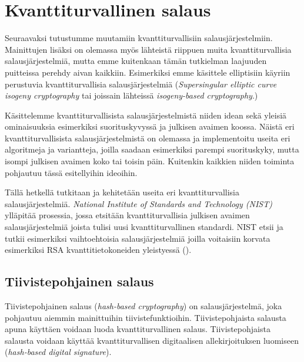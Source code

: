 \chapter{Kvanttiturvallinen salaus\label{results}}

Seuraavaksi tutustumme muutamiin kvanttiturvallisiin salausjärjestelmiin. Mainittujen lisäksi on olemassa myös lähteistä riippuen muita kvanttiturvallisia salausjärjestelmiä, mutta emme kuitenkaan tämän tutkielman laajuuden puitteissa perehdy aivan kaikkiin. Esimerkiksi emme käsittele elliptisiin käyriin perustuvia kvanttiturvallisia salausjärjestelmiä (\emph{Supersingular elliptic curve isogeny cryptography} tai joissain lähteissä \emph{isogeny-based cryptography}.)


Käsittelemme kvanttiturvallisista salausjärjestelmistä niiden idean sekä yleisiä ominaisuuksia esimerkiksi suorituskyvyssä ja julkisen avaimen koossa. Näistä eri kvanttiturvallisista salausjärjestelmistä on olemassa ja implementoitu useita eri algoritmeja ja variantteja, joilla saadaan esimerkiksi parempi suorituskyky, mutta isompi julkisen avaimen koko tai toisin päin. Kuitenkin kaikkien niiden toiminta pohjautuu tässä esitellyihin ideoihin.

Tällä hetkellä tutkitaan ja kehitetään useita eri kvanttiturvallisia salausjärjestelmiä. \emph{National Institute of Standards and Technology (NIST)} ylläpitää prosessia, jossa etsitään kvanttiturvallisia julkisen avaimen salausjärjestelmiä joista tulisi uusi kvanttiturvallinen standardi. NIST etsii ja tutkii esimerkiksi vaihtoehtoisia salausjärjestelmiä joilla voitaisiin korvata esimerkiksi RSA kvanttitietokoneiden yleistyessä (\cite{alagic2020status}).

\section{Tiivistepohjainen salaus}
Tiivistepohjainen salaus (\emph{hash-based cryptography}) on salausjärjestelmä, joka pohjautuu aiemmin mainittuihin tiivistefunktioihin. Tiivistepohjaista salausta apuna käyttäen voidaan luoda kvanttiturvallinen salaus. Tiivistepohjaista salausta voidaan käyttää kvanttiturvallisen digitaalisen allekirjoituksen luomiseen (\emph{hash-based digital signature}). 

